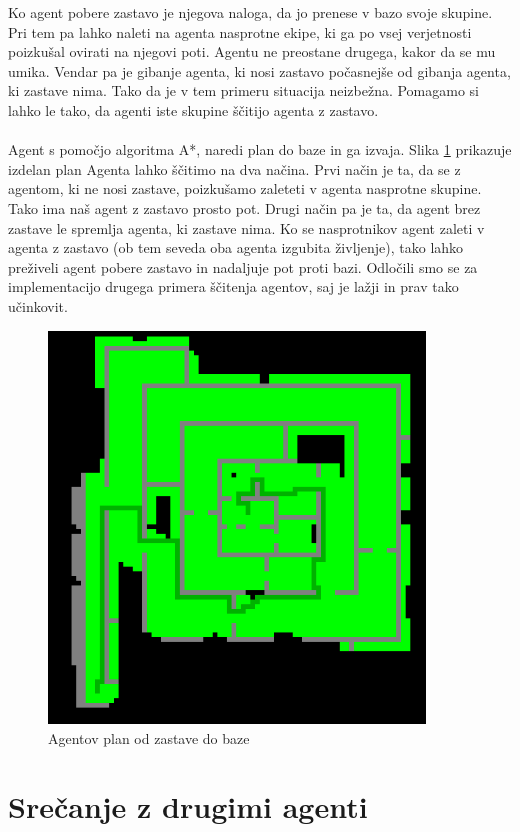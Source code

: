 \documentclass[12pt,a4paper,openany]{book}
\begin{document}
Ko agent pobere zastavo je njegova naloga, da jo prenese v bazo svoje skupine. Pri tem pa lahko
 naleti na agenta nasprotne ekipe, ki ga po vsej verjetnosti poizkušal ovirati na njegovi poti.
 Agentu ne preostane drugega, kakor da se mu umika. Vendar pa je gibanje agenta, ki nosi zastavo
 počasnejše od gibanja agenta, ki zastave nima. Tako da je v tem primeru situacija neizbežna. 
Pomagamo si lahko le tako, da agenti iste skupine ščitijo agenta z zastavo.\\
\\
Agent s pomočjo algoritma A*, naredi plan do baze in ga izvaja. Slika \ref{plan} prikazuje izdelan 
plan Agenta lahko ščitimo na dva načina. Prvi način je ta, da se z agentom, ki ne nosi zastave, 
poizkušamo zaleteti v  agenta nasprotne skupine. Tako ima naš agent z zastavo prosto pot. 
Drugi način pa je ta, da agent brez zastave le spremlja agenta, ki zastave nima. Ko se 
nasprotnikov agent zaleti v agenta z zastavo (ob tem seveda oba agenta izgubita življenje), 
tako lahko preživeli agent pobere zastavo in nadaljuje pot proti bazi. Odločili smo se za 
implementacijo drugega primera ščitenja agentov, saj je lažji in prav tako učinkovit.\\
\begin{figure}[ht]
 \centering
 \includegraphics[width=10cm]{./pictures/plan.png}
 \caption[Izdelan plan]{Agentov plan od zastave do baze}
 \label{plan}
\end{figure}


\section{Srečanje z drugimi agenti}
\end{document}
